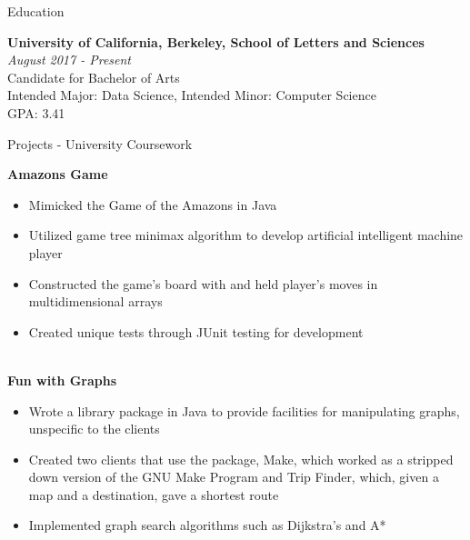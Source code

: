 \documentclass{resume} %
\begin{document}

\begin{rSection}{Education}

{\bf University of California, Berkeley, School of Letters and Sciences} \hfill 
{\em August 2017 - Present} 
\\ Candidate for Bachelor of Arts
\\ Intended Major: Data Science, Intended Minor: Computer Science
\\ GPA: 3.41

\end{rSection}
\begin{rSection}{Projects - University Coursework}

{\bf Amazons Game}
\begin{itemize}
    \itemsep-0.75em 
    \item Mimicked the Game of the Amazons in Java
    \item Utilized game tree minimax algorithm to develop artificial intelligent machine player
    \item Constructed the game’s board with and held player’s moves in multidimensional arrays
    \item Created unique tests through JUnit testing for development
\end{itemize}

\\{\bf Fun with Graphs}
\begin{itemize}
    \itemsep-0.75em 
    \item Wrote a library package in Java to provide facilities for manipulating graphs, unspecific to the clients
    \item Created two clients that use the package, Make, which worked as a stripped down version of the GNU Make Program and Trip Finder, which, given a map and a destination, gave a shortest route 
    \item Implemented graph search algorithms such as Dijkstra's and A*
\end{itemize}

\end{rSection}
\end{document}
